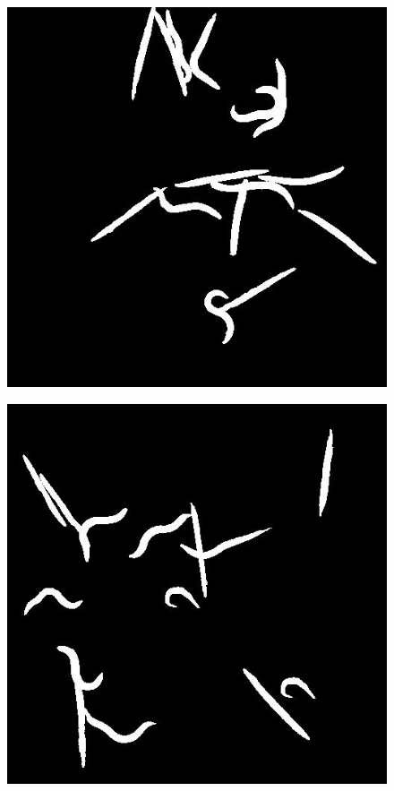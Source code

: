 	\begin{figure}[!htp]    
	\begin{minipage}[t]{0.49\linewidth}%
		\centering    
		\includegraphics[width=1\linewidth]{figure/chap4/multi-worm.jpg}    
		\label{fig:angle}    
	\end{minipage}    
	\begin{minipage}[t]{0.49\linewidth}%
		\centering    
		\includegraphics[width=1\linewidth]{figure/chap4/multi-worm1.jpg}    

\end{minipage}
\end{figure}
